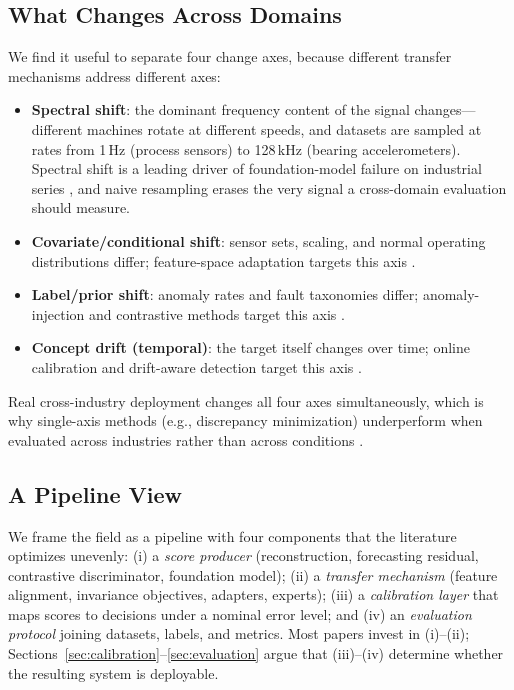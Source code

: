 \subsection{What Changes Across Domains}
We find it useful to separate four change axes, because different transfer mechanisms address different axes:
\begin{itemize}
\item \textbf{Spectral shift}: the dominant frequency content of the signal changes---different machines rotate at different speeds, and datasets are sampled at rates from 1\,Hz (process sensors) to 128\,kHz (bearing accelerometers). Spectral shift is a leading driver of foundation-model failure on industrial series \cite{freqmatters2025,foundational2025}, and naive resampling erases the very signal a cross-domain evaluation should measure.
\item \textbf{Covariate/conditional shift}: sensor sets, scaling, and normal operating distributions differ; feature-space adaptation targets this axis \cite{dacad2024,2310_14790}.
\item \textbf{Label/prior shift}: anomaly rates and fault taxonomies differ; anomaly-injection and contrastive methods target this axis \cite{dacad2024,2411_00914}.
\item \textbf{Concept drift (temporal)}: the target itself changes over time; online calibration and drift-aware detection target this axis \cite{2506_15831,2412_08435,2410_10041}.
\end{itemize}
Real cross-industry deployment changes all four axes simultaneously, which is why single-axis methods (e.g., discrepancy minimization) underperform when evaluated across industries rather than across conditions \cite{2503_23060}.

\subsection{A Pipeline View}
We frame the field as a pipeline with four components that the literature optimizes unevenly: (i) a \emph{score producer} (reconstruction, forecasting residual, contrastive discriminator, foundation model); (ii) a \emph{transfer mechanism} (feature alignment, invariance objectives, adapters, experts); (iii) a \emph{calibration layer} that maps scores to decisions under a nominal error level; and (iv) an \emph{evaluation protocol} joining datasets, labels, and metrics. Most papers invest in (i)--(ii); Sections~\ref{sec:calibration}--\ref{sec:evaluation} argue that (iii)--(iv) determine whether the resulting system is deployable.
